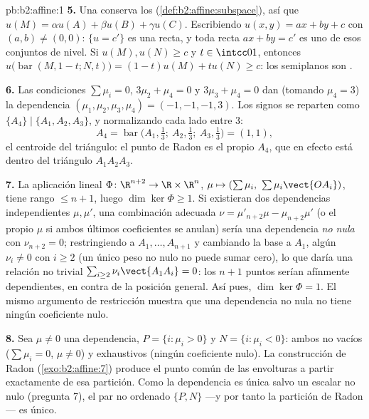 \begin{solution}{pb:b2:affine:1}
\textbf{5.} Una  conserva los 
(\cref{def:b2:affine:subspace}), así que $u(M) = \alpha u(A) + \beta
u(B) + \gamma u(C)$. Escribiendo $u(x, y) = ax + by + c$ con $(a, b)
\neq (0,0)$: $\{u = c'\}$ es una recta, y toda recta $ax + by = c'$
es uno de esos conjuntos de nivel. Si $u(M), u(N) \geq c$ y $t \in
\intcc01$, entonces $u\bigl(\operatorname{bar}(M, 1-t; N, t)\bigr) =
(1-t)u(M) + tu(N) \geq c$: los semiplanos son .

\textbf{6.} Las condiciones $\sum\mu_i = 0$, $3\mu_2 + \mu_4 = 0$ y
$3\mu_3 + \mu_4 = 0$ dan (tomando $\mu_4 = 3$) la dependencia
$(\mu_1, \mu_2, \mu_3, \mu_4) = (-1, -1, -1, 3)$. Los signos se
reparten como $\{A_4\} \mid \{A_1, A_2, A_3\}$, y normalizando cada
lado entre $3$:
\[
A_4 = \operatorname{bar}\bigl(A_1, \tfrac13;\ A_2, \tfrac13;\
A_3, \tfrac13\bigr) = (1,1),
\]
el centroide del triángulo: el punto de Radon es el propio $A_4$,
que en efecto está dentro del triángulo $A_1A_2A_3$.

\textbf{7.} La aplicación lineal $\Phi \colon \R^{n+2} \to \R \times
\R^n$, $\mu \mapsto (\sum\mu_i,\ \sum\mu_i\vect{OA_i})$, tiene rango
$\leq n + 1$, luego $\dim\ker \Phi \geq 1$. Si existieran dos
dependencias independientes $\mu, \mu'$, una combinación adecuada
$\nu = \mu'_{n+2}\mu - \mu_{n+2}\mu'$ (o el propio $\mu$ si ambos
últimos coeficientes se anulan) sería una dependencia \emph{no nula}
con $\nu_{n+2} = 0$; restringiendo a $A_1, \dots, A_{n+1}$ y
cambiando la base a $A_1$, algún $\nu_i \neq 0$ con $i \geq 2$ (un
único peso no nulo no puede sumar cero), lo que daría una relación no
trivial $\sum_{i\geq2}\nu_i\vect{A_1A_i} = 0$: los $n+1$ puntos
serían afínmente dependientes, en contra de la posición general. Así
pues, $\dim\ker \Phi = 1$. El mismo argumento de restricción muestra
que una dependencia no nula no tiene ningún coeficiente nulo.

\textbf{8.} Sea $\mu \neq 0$ una dependencia, $P = \{i : \mu_i > 0\}$
y $N = \{i : \mu_i < 0\}$: ambos no vacíos ($\sum\mu_i = 0$, $\mu
\neq 0$) y exhaustivos (ningún coeficiente nulo). La construcción de
Radon (\cref{exo:b2:affine:7}) produce el punto común de las
envolturas a partir exactamente de esa partición. Como la dependencia
es única salvo un escalar no nulo (pregunta 7), el par no ordenado
$\{P, N\}$ ---y por tanto la partición de Radon--- es único.


\end{solution}

